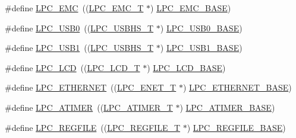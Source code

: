 \begin{DoxyCompactItemize}
\#define \hyperlink{group___p_e_r_i_p_h__18_x_x___b_a_s_e_ga115afed5bd08559bbc4eba50e7c23495}{L\+P\+C\+\_\+\+E\+MC}~((\hyperlink{struct_l_p_c___e_m_c___t}{L\+P\+C\+\_\+\+E\+M\+C\+\_\+T}              $\ast$) \hyperlink{group___p_e_r_i_p_h__43_x_x___b_a_s_e_ga52f586bf3c6855ad4ef03b1fee3f2f0d}{L\+P\+C\+\_\+\+E\+M\+C\+\_\+\+B\+A\+SE})
\item 
\#define \hyperlink{group___p_e_r_i_p_h__18_x_x___b_a_s_e_ga25ec9d077b8c13aadf9ca3c872c5c8d1}{L\+P\+C\+\_\+\+U\+S\+B0}~((\hyperlink{struct_l_p_c___u_s_b_h_s___t}{L\+P\+C\+\_\+\+U\+S\+B\+H\+S\+\_\+T}            $\ast$) \hyperlink{group___p_e_r_i_p_h__43_x_x___b_a_s_e_ga41d15fd328f821807d202d6c9feb096c}{L\+P\+C\+\_\+\+U\+S\+B0\+\_\+\+B\+A\+SE})
\item 
\#define \hyperlink{group___p_e_r_i_p_h__18_x_x___b_a_s_e_gab2ca840614a0bf9f3d042a75f49bc9c8}{L\+P\+C\+\_\+\+U\+S\+B1}~((\hyperlink{struct_l_p_c___u_s_b_h_s___t}{L\+P\+C\+\_\+\+U\+S\+B\+H\+S\+\_\+T}            $\ast$) \hyperlink{group___p_e_r_i_p_h__43_x_x___b_a_s_e_ga72922dbb8f7e3016015922b225773710}{L\+P\+C\+\_\+\+U\+S\+B1\+\_\+\+B\+A\+SE})
\item 
\#define \hyperlink{group___p_e_r_i_p_h__18_x_x___b_a_s_e_ga68cb24e38b29356c45f9bb634b35c677}{L\+P\+C\+\_\+\+L\+CD}~((\hyperlink{struct_l_p_c___l_c_d___t}{L\+P\+C\+\_\+\+L\+C\+D\+\_\+T}              $\ast$) \hyperlink{group___p_e_r_i_p_h__43_x_x___b_a_s_e_gae1746cd618a1eb4f24f95255594f159a}{L\+P\+C\+\_\+\+L\+C\+D\+\_\+\+B\+A\+SE})
\item 
\#define \hyperlink{group___p_e_r_i_p_h__18_x_x___b_a_s_e_gaddb977e4442891b21ced3344c71440d7}{L\+P\+C\+\_\+\+E\+T\+H\+E\+R\+N\+ET}~((\hyperlink{struct_l_p_c___e_n_e_t___t}{L\+P\+C\+\_\+\+E\+N\+E\+T\+\_\+T}             $\ast$) \hyperlink{group___p_e_r_i_p_h__43_x_x___b_a_s_e_ga7da6912c1d137fdfb86cedc9efb8c8d6}{L\+P\+C\+\_\+\+E\+T\+H\+E\+R\+N\+E\+T\+\_\+\+B\+A\+SE})
\item 
\#define \hyperlink{group___p_e_r_i_p_h__18_x_x___b_a_s_e_ga3e623a85783fae5ce265530fc079841c}{L\+P\+C\+\_\+\+A\+T\+I\+M\+ER}~((\hyperlink{struct_l_p_c___a_t_i_m_e_r___t}{L\+P\+C\+\_\+\+A\+T\+I\+M\+E\+R\+\_\+T}           $\ast$) \hyperlink{group___p_e_r_i_p_h__43_x_x___b_a_s_e_gaccf3a9c6522b5cfc6d9ddc21f0500ec0}{L\+P\+C\+\_\+\+A\+T\+I\+M\+E\+R\+\_\+\+B\+A\+SE})
\item 
\#define \hyperlink{group___p_e_r_i_p_h__18_x_x___b_a_s_e_ga2c74da31b7fd461d9b01e3241963f895}{L\+P\+C\+\_\+\+R\+E\+G\+F\+I\+LE}~((\hyperlink{struct_l_p_c___r_e_g_f_i_l_e___t}{L\+P\+C\+\_\+\+R\+E\+G\+F\+I\+L\+E\+\_\+T}          $\ast$) \hyperlink{group___p_e_r_i_p_h__43_x_x___b_a_s_e_gad2674eff10cea9243ab060ad1fbac9d2}{L\+P\+C\+\_\+\+R\+E\+G\+F\+I\+L\+E\+\_\+\+B\+A\+SE})

\end{DoxyCompactItemize}
